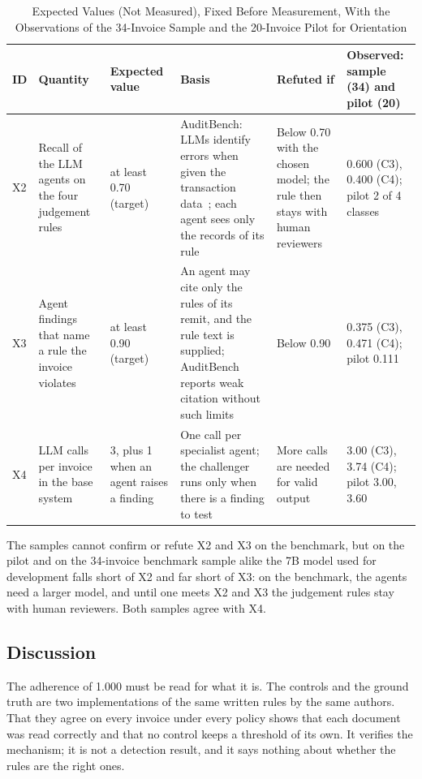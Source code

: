 \documentclass[conference]{IEEEtran}
\begin{document}
\begin{table}[t]
\caption{Expected Values (Not Measured), Fixed Before Measurement, With the Observations of the 34-Invoice Sample and the 20-Invoice Pilot for Orientation}
\label{tab:expected}
\centering
\footnotesize
\setlength{\tabcolsep}{4pt}
\renewcommand{\arraystretch}{1.15}
\begin{tabular}{L{0.45cm}L{3.5cm}L{2.0cm}L{4.6cm}L{3.0cm}L{2.4cm}}
\toprule
ID & Quantity & Expected value & Basis & Refuted if & Observed: sample (34) and pilot (20) \\
\midrule
X2 & Recall of the LLM agents on the four judgement rules & at least 0.70 (target) & AuditBench: LLMs identify errors when given the transaction data~\cite{wang2025auditbench}; each agent sees only the records of its rule & Below 0.70 with the chosen model; the rule then stays with human reviewers & 0.600 (C3), 0.400 (C4); pilot 2 of 4 classes \\
X3 & Agent findings that name a rule the invoice violates & at least 0.90 (target) & An agent may cite only the rules of its remit, and the rule text is supplied; AuditBench reports weak citation without such limits~\cite{wang2025auditbench} & Below 0.90 & 0.375 (C3), 0.471 (C4); pilot 0.111 \\
X4 & LLM calls per invoice in the base system & 3, plus 1 when an agent raises a finding & One call per specialist agent; the challenger runs only when there is a finding to test & More calls are needed for valid output & 3.00 (C3), 3.74 (C4); pilot 3.00, 3.60 \\
\bottomrule
\end{tabular}
\end{table}

The samples cannot confirm or refute X2 and X3 on the benchmark, but on the pilot and on the 34-invoice benchmark sample alike the 7B model used for development falls short of X2 and far short of X3: on the benchmark, the agents need a larger model, and until one meets X2 and X3 the judgement rules stay with human reviewers. Both samples agree with X4.

\subsection{Discussion}
The adherence of 1.000 must be read for what it is. The controls and the ground truth are two implementations of the same written rules by the same authors. That they agree on every invoice under every policy shows that each document was read correctly and that no control keeps a threshold of its own. It verifies the mechanism; it is not a detection result, and it says nothing about whether the rules are the right ones.
\end{document}
